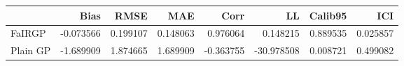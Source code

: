 \begin{tabular}{lrrrrrrr}
\toprule
{} &      Bias &      RMSE &       MAE &      Corr &         LL &   Calib95 &       ICI \\
\midrule
FaIRGP   & -0.073566 &  0.199107 &  0.148063 &  0.976064 &   0.148215 &  0.889535 &  0.025857 \\
Plain GP & -1.689909 &  1.874665 &  1.689909 & -0.363755 & -30.978508 &  0.008721 &  0.499082 \\
\bottomrule
\end{tabular}
